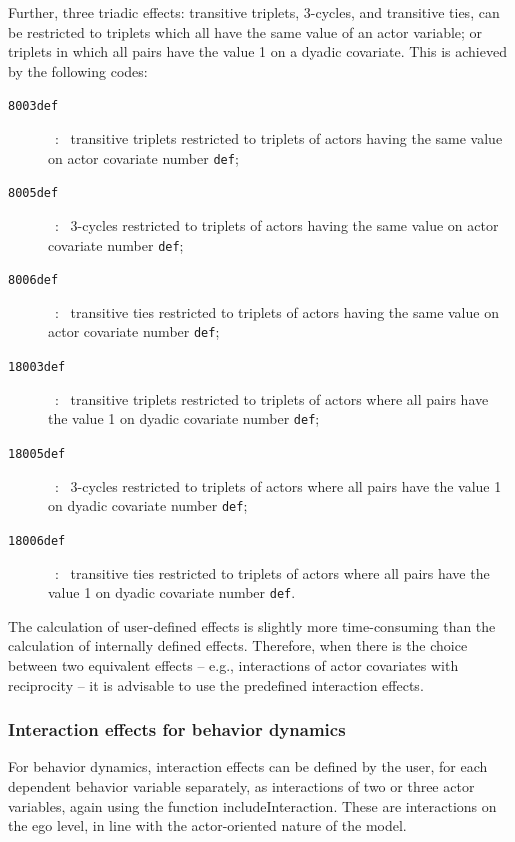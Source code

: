 \documentclass[a4paper,fleqn,11pt]{article}
\newcommand{\+}{\, + \,}
\begin{document}
Further, three triadic effects: transitive triplets, 3-cycles,
and transitive ties, can be restricted to triplets which all have the
same value of an actor variable; or triplets in which all pairs
have the value 1 on a dyadic covariate.
This is achieved by the following codes:
\begin{description}
\item[\texttt{8003def}]\ : \ transitive triplets
                         restricted to triplets of actors
                        having the same value on actor
                        covariate number \texttt{def};
\item[\texttt{8005def}]\ : \  3-cycles restricted to triplets of actors
                        having the same value
                        on actor covariate number \texttt{def};
\item[\texttt{8006def}]\ : \  transitive ties restricted to triplets of actors
                        having the same value
                        on actor covariate number \texttt{def};
\item[\texttt{18003def}]\ : \  transitive triplets restricted
                        to triplets of actors
                        where all pairs have the value 1
                        on dyadic covariate number \texttt{def};
\item[\texttt{18005def}]\ : \  3-cycles restricted to triplets of actors
                        where all pairs have the value 1
                        on dyadic covariate number \texttt{def};
\item[\texttt{18006def}]\ : \  transitive ties restricted to
                        triplets of actors
                        where all pairs have the value 1
                        on dyadic covariate number \texttt{def}.
\end{description}


The calculation of user-defined effects is slightly more time-consuming
than the calculation of internally defined effects. Therefore, when there
is the choice between two equivalent effects -- e.g., interactions
of actor covariates with reciprocity -- it is advisable to use
the predefined interaction effects.
\fi

\subsubsection{Interaction effects for behavior dynamics}
\label{S_beh_infl}

For behavior dynamics, interaction effects can be defined
by the user, for each dependent behavior variable separately,
as interactions of two or three actor variables,
again using the function \textsf{includeInteraction}.
These are interactions on the ego level, in line with the
actor-oriented nature of the model.
\end{document}
